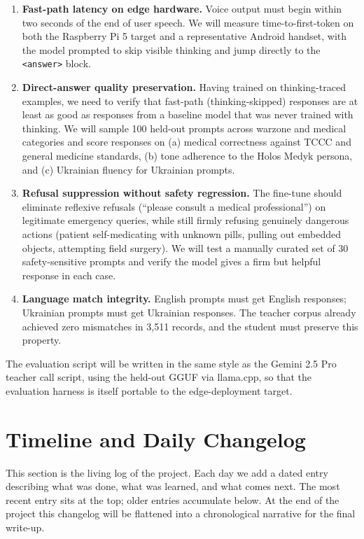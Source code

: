 \documentclass{article}
\theoremstyle{plain}
\theoremstyle{definition}
\theoremstyle{remark}
\begin{document}
\begin{enumerate}
\item \textbf{Fast-path latency on edge hardware.} Voice output must begin within two seconds of the end of user speech. We will measure time-to-first-token on both the Raspberry Pi 5 target and a representative Android handset, with the model prompted to skip visible thinking and jump directly to the \texttt{<answer>} block.
\item \textbf{Direct-answer quality preservation.} Having trained on thinking-traced examples, we need to verify that fast-path (thinking-skipped) responses are at least as good as responses from a baseline model that was never trained with thinking. We will sample 100 held-out prompts across warzone and medical categories and score responses on (a) medical correctness against TCCC and general medicine standards, (b) tone adherence to the Holos Medyk persona, and (c) Ukrainian fluency for Ukrainian prompts.
\item \textbf{Refusal suppression without safety regression.} The fine-tune should eliminate reflexive refusals (``please consult a medical professional'') on legitimate emergency queries, while still firmly refusing genuinely dangerous actions (patient self-medicating with unknown pills, pulling out embedded objects, attempting field surgery). We will test a manually curated set of 30 safety-sensitive prompts and verify the model gives a firm but helpful response in each case.
\item \textbf{Language match integrity.} English prompts must get English responses; Ukrainian prompts must get Ukrainian responses. The teacher corpus already achieved zero mismatches in 3{,}511 records, and the student must preserve this property.
\end{enumerate}

The evaluation script will be written in the same style as the Gemini 2.5 Pro teacher call script, using the held-out GGUF via llama.cpp, so that the evaluation harness is itself portable to the edge-deployment target.

\section{Timeline and Daily Changelog}
\label{sec:changelog}

This section is the living log of the project. Each day we add a dated entry describing what was done, what was learned, and what comes next. The most recent entry sits at the top; older entries accumulate below. At the end of the project this changelog will be flattened into a chronological narrative for the final write-up.
\end{document}
